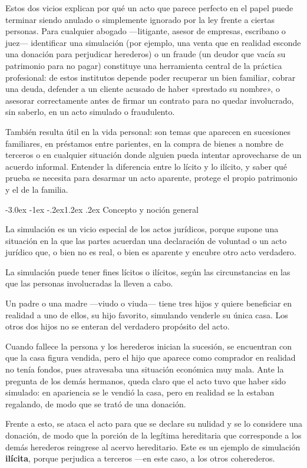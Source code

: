 \documentclass[12pt,oneside]{book}
\makeatletter
\renewcommand\section{\@startsection{section}{1}{\z@}%
  {-3.0ex \@plus -1ex \@minus -.2ex}{1.2ex \@plus .2ex}%
  {\normalfont\large\bfseries\color{acento}}}
\makeatother
\begin{document}
\begin{nota}
Estos dos vicios explican por qué un acto que parece perfecto en el papel puede terminar siendo anulado o simplemente ignorado por la ley frente a ciertas personas. Para cualquier abogado ---litigante, asesor de empresas, escribano o juez--- identificar una simulación (por ejemplo, una venta que en realidad esconde una donación para perjudicar herederos) o un fraude (un deudor que vacía su patrimonio para no pagar) constituye una herramienta central de la práctica profesional: de estos institutos depende poder recuperar un bien familiar, cobrar una deuda, defender a un cliente acusado de haber «prestado su nombre», o asesorar correctamente antes de firmar un contrato para no quedar involucrado, sin saberlo, en un acto simulado o fraudulento.

También resulta útil en la vida personal: son temas que aparecen en sucesiones familiares, en préstamos entre parientes, en la compra de bienes a nombre de terceros o en cualquier situación donde alguien pueda intentar aprovecharse de un acuerdo informal. Entender la diferencia entre lo lícito y lo ilícito, y saber qué prueba se necesita para desarmar un acto aparente, protege el propio patrimonio y el de la familia.

\end{nota}

\section{Concepto y noción general}

La simulación es un vicio especial de los actos jurídicos, porque supone una situación en la que las partes acuerdan una declaración de voluntad o un acto jurídico que, o bien no es real, o bien es aparente y encubre otro acto verdadero.

La simulación puede tener fines lícitos o ilícitos, según las circunstancias en las que las personas involucradas la lleven a cabo.

\begin{ejemplo}
Un padre o una madre ---viudo o viuda--- tiene tres hijos y quiere beneficiar en realidad a uno de ellos, su hijo favorito, simulando venderle su única casa. Los otros dos hijos no se enteran del verdadero propósito del acto.

Cuando fallece la persona y los herederos inician la sucesión, se encuentran con que la casa figura vendida, pero el hijo que aparece como comprador en realidad no tenía fondos, pues atravesaba una situación económica muy mala. Ante la pregunta de los demás hermanos, queda claro que el acto tuvo que haber sido simulado: en apariencia se le vendió la casa, pero en realidad se la estaban regalando, de modo que se trató de una donación.

Frente a esto, se ataca el acto para que se declare su nulidad y se lo considere una donación, de modo que la porción de la legítima hereditaria que corresponde a los demás herederos reingrese al acervo hereditario. Este es un ejemplo de simulación \textbf{ilícita}, porque perjudica a terceros ---en este caso, a los otros coherederos.
\end{ejemplo}
\end{document}
